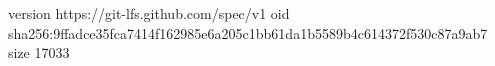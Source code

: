version https://git-lfs.github.com/spec/v1
oid sha256:9ffadce35fca7414f162985e6a205c1bb61da1b5589b4c614372f530c87a9ab7
size 17033
